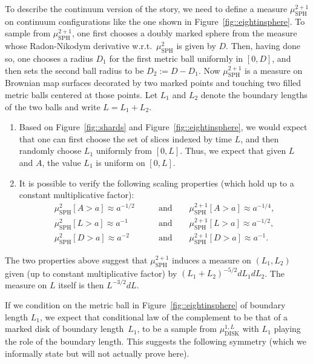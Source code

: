 \documentclass[JEP,XML,SOM,Unicode]{cedram}
\theoremstyle{plain}
\numberwithin{theorem}{section}
\theoremstyle{definition}
\newcommand{\mustwo}{\mu_{\mathrm{SPH}}^2}
\newcommand{\mustwoplusone}{\mu_{\mathrm{SPH}}^{2+1}}
\newcommand{\mudonel}{\mu_{ \mathrm{DISK}}^{1, L}}
\begin{document}
To describe the continuum version of the story, we need to define a measure $\mustwoplusone$ on continuum configurations like the one shown in Figure~\ref{fig::eightinsphere}. To sample from $\mustwoplusone$, one first chooses a doubly marked sphere from the measure whose Radon-Nikodym derivative w.r.t.\ $\mustwo$ is given by $D$. Then, having done so, one chooses a radius $D_1$ for the first metric ball uniformly in $[0,D]$, and then sets the second ball radius to be $D_2 := D-D_1$. Now $\mustwoplusone$ is a measure on Brownian map surfaces decorated by two marked points and touching two filled metric balls centered at those points. Let $L_1$ and $L_2$ denote the boundary lengths of the two balls and write $L = L_1 + L_2$.

\begin{enumerate}
\item Based on Figure~\ref{fig::shards} and Figure~\ref{fig::eightinsphere}, we would expect that one can first choose the set of slices indexed by time $L$, and then randomly choose $L_1$ uniformly from $[0,L]$. Thus, we expect that given $L$ and $A$, the value $L_1$ is uniform on $[0,L]$.
\item It is possible to verify the following scaling properties (which hold up to a constant multiplicative factor):
\begin{align*}
\mustwo[ A > a] \approx a^{-1/2} \quad\quad&\mathrm{and}\quad\quad \mustwoplusone[ A > a ] \approx a^{-1/4},\\
\mustwo[ L > a ] \approx a^{-1} \quad\quad&\mathrm{and}\quad\quad \mustwoplusone[ L > a ] \approx a^{-1/2}, \\
\mustwo[ D > a ] \approx a^{-2} \quad\quad&\mathrm{and}\quad\quad \mustwoplusone [ D > a ] \approx a^{-1}.
\end{align*}
\end{enumerate}

The two properties above suggest that $\mustwoplusone$ induces a measure on $(L_1, L_2)$ given (up to constant multiplicative factor) by $(L_1 + L_2)^{-5/2}dL_1 dL_2$. The measure on $L$ itself is then $L^{-3/2} dL$.

If we condition on the metric ball in Figure~\ref{fig::eightinsphere} of boundary length $L_1$, we expect that conditional law of the complement to be that of a marked disk of boundary length~$L_1$, \ie to be a sample from $\mudonel$ with $L_1$ playing the role of the boundary length. This suggests the following symmetry (which we informally state but will not actually prove here).
\end{document}
